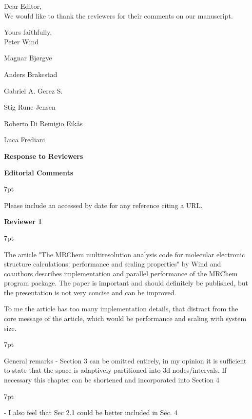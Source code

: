 \documentclass[11pt]{article}
\newenvironment{formal}{%
  \def\FrameCommand{%
    \hspace{1pt}%
    {\color{darkblue}\vrule width 2pt}%
    {\color{formalshade}\vrule width 4pt}%
    \colorbox{formalshade}%
  }%
  \MakeFramed{\advance\hsize-\width\FrameRestore}%
  \noindent\hspace{-4.55pt}%
  \begin{adjustwidth}{}{7pt}%
  \vspace{2pt}\vspace{2pt}%
}
{%
  \vspace{2pt}\end{adjustwidth}\endMakeFramed%
}
\begin{document}
Dear Editor,\\

We would like to thank the reviewers for their comments on our manuscript. 

Yours faithfully,
\\

Peter Wind

Magnar Bj{\o}rgve 

Anders Brakestad

Gabriel A. Gerez S.

Stig Rune Jensen 

Roberto Di Remigio Eik{\aa}s

Luca Frediani

\clearpage

{\Large \bf Response to Reviewers}

\vspace{1em}

{\bf Editorial Comments}

\begin{formal}
Please include an accessed by date for any reference citing a URL.
\end{formal}

{\bf Reviewer 1}

\begin{formal}
The article "The MRChem multiresolution analysis code for molecular electronic structure calculations: performance and scaling properties" by Wind and coauthors describes implementation and parallel performance of the MRChem program package. The paper is important and should definitely be published, but the presentation is not very concise and can be improved.

To me the article has too many implementation details, that distract from the core message of the article, which would be performance and scaling with system size.
\end{formal}

\begin{formal}
General remarks
 - Section 3 can be omitted entirely, in my opinion it is sufficient to state that the space is adaptively partitioned into 3d nodes/intervals. If necessary this chapter can be shortened and incorporated into Section 4
 \end{formal}
 
 \begin{formal}
 - I also feel that Sec 2.1 could be better included in Sec. 4
 \end{formal}
 
\end{document}
